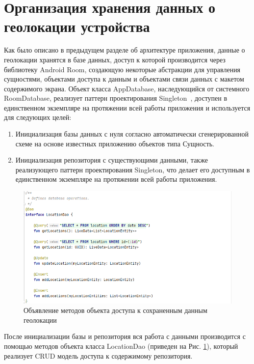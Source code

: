 \section{Организация хранения данных о геолокации устройства}
Как было описано в предыдущем разделе об архитектуре приложения, данные о геолокации хранятся в базе данных, доступ к которой производится через библиотеку Android Room, создающую некоторые абстракции для управления сущностями, объектами доступа к данным и объектами связи данных с макетом содержимого экрана.
Объект класса AppDatabase, наследующийся от системного RoomDatabase, реализует паттерн проектирования Singleton~\autocite{singleton}, доступен в единственном экземпляре на протяжении всей работы приложения и используется для следующих целей:
\begin{enumerate}
	\item Инициализация базы данных с нуля согласно автоматически сгенерированной схеме на основе известных приложению объектов типа Сущность.
	\item Инициализация репозитория с существующими данными, также реализующего паттерн проектирования Singleton, что делает его доступным в единственном экземпляре на протяжении всей работы приложения.
\end{enumerate}

\smallskip

\begin{figure}
	\centering
	\includegraphics[width=\textwidth]{flesh/somefunc/location_dao.png}
	\caption{\label{fig:location_dao}Объявление методов объекта доступа к сохраненным данным геолокации}
\end{figure}

После инициализации базы и репозитория вся работа с данными производится с помощью методов объекта класса LocationDao (приведен на Рис. \ref{fig:location_dao}), который реализует CRUD модель доступа к содержимому репозитория.

